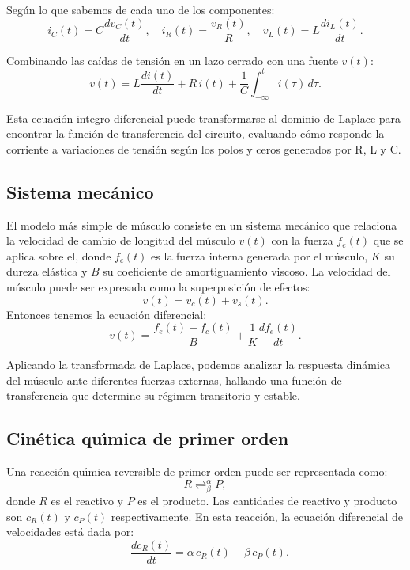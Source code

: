 Seg\'{u}n lo que sabemos de cada uno de los componentes: 
\begin{equation}
	i_{C}(t) = C\frac{dv_{C}(t)}{dt}, \quad i_{R}(t) = \frac{v_{R}(t)}{R}, \quad v_{L}(t) = L\frac{di_{L}(t)}{dt}.
\end{equation}

Combinando las caídas de tensión en un lazo cerrado con una fuente $v(t)$:
\begin{equation}
	v(t) = L\frac{di(t)}{dt} + R \, i(t) + \frac{1}{C}\int_{-\infty }^{t} i(\tau) \, d\tau.
	\label{sisUno}
\end{equation}

Esta ecuación integro-diferencial puede transformarse al dominio de Laplace para encontrar la función de transferencia del circuito, evaluando cómo responde la corriente a variaciones de tensión según los polos y ceros generados por R, L y C.

\subsection{Sistema mec\'{a}nico}

El modelo m\'{a}s simple de m\'{u}sculo consiste en un sistema mec\'{a}nico que relaciona la velocidad de cambio de longitud del m\'{u}sculo $v(t)$ con la fuerza $f_{e}(t)$ que se aplica sobre el, donde $f_{c}(t)$ es la fuerza interna generada por el m\'{u}sculo, $K$ su dureza elástica y $B$ su coeficiente de amortiguamiento viscoso. La velocidad del m\'{u}sculo puede ser expresada como la superposición de efectos:
\begin{equation}
	v(t) = v_{c}(t) + v_{s}(t).
\end{equation}
Entonces tenemos la ecuaci\'{o}n diferencial:
\begin{equation}
	v(t) = \frac{f_{e}(t) - f_{c}(t)}{B} + \frac{1}{K}\frac{df_{e}(t)}{dt}.
	\label{sisDos}
\end{equation}

Aplicando la transformada de Laplace, podemos analizar la respuesta dinámica del músculo ante diferentes fuerzas externas, hallando una función de transferencia que determine su régimen transitorio y estable.

\subsection{Cin\'{e}tica qu\'{\i}mica de primer orden}

Una reacci\'{o}n qu\'{\i}mica reversible de primer orden puede ser representada como:
\begin{equation}
	R \rightleftharpoons_{\beta}^{\alpha} P,
\end{equation}
donde $R$ es el reactivo y $P$ es el producto. Las cantidades de reactivo y producto son $c_{R}(t)$ y $c_{P}(t)$ respectivamente. En esta reacci\'{o}n, la ecuaci\'{o}n diferencial de velocidades est\'{a} dada por:
\begin{equation}
	-\frac{dc_{R}(t)}{dt} = \alpha \, c_{R}(t) - \beta \, c_{P}(t).
\end{equation}

